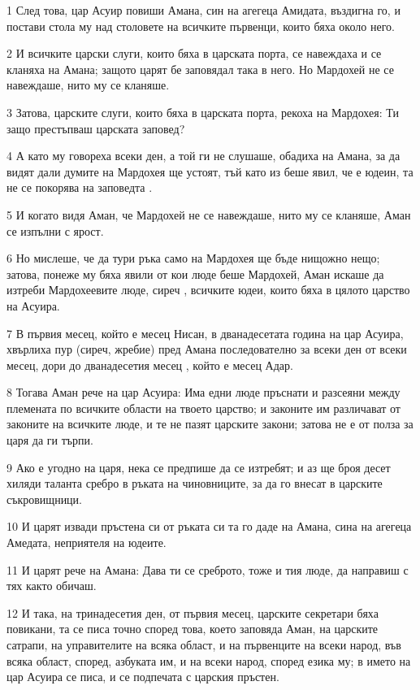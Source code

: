 \par 1 След това, цар Асуир повиши Амана, син на агегеца Амидата, въздигна го, и постави стола му над столовете на всичките първенци, които бяха около него.
\par 2 И всичките царски слуги, които бяха в царската порта, се навеждаха и се кланяха на Амана; защото царят бе заповядал така в него. Но Мардохей не се навеждаше, нито му се кланяше.
\par 3 Затова, царските слуги, които бяха в царската порта, рекоха на Мардохея: Ти защо престъпваш царската заповед?
\par 4 А като му говореха всеки ден, а той ги не слушаше, обадиха на Амана, за да видят дали думите на Мардохея ще устоят, тъй като из беше явил, че е юдеин, та не се покорява на заповедта .
\par 5 И когато видя Аман, че Мардохей не се навеждаше, нито му се кланяше, Аман се изпълни с ярост.
\par 6 Но мислеше, че да тури ръка само на Мардохея ще бъде нищожно нещо; затова, понеже му бяха явили от кои люде беше Мардохей, Аман искаше да изтреби Мардохеевите люде, сиреч , всичките юдеи, които бяха в цялото царство на Асуира.
\par 7 В първия месец, който е месец Нисан, в дванадесетата година на цар Асуира, хвърлиха пур (сиреч, жребие) пред Амана последователно за всеки ден от всеки месец, дори до дванадесетия месец , който е месец Адар.
\par 8 Тогава Аман рече на цар Асуира: Има едни люде пръснати и разсеяни между племената по всичките области на твоето царство; и законите им различават от законите на всичките люде, и те не пазят царските закони; затова не е от полза за царя да ги търпи.
\par 9 Ако е угодно на царя, нека се предпише да се изтребят; и аз ще броя десет хиляди таланта сребро в ръката на чиновниците, за да го внесат в царските съкровищници.
\par 10 И царят извади пръстена си от ръката си та го даде на Амана, сина на агегеца Амедата, неприятеля на юдеите.
\par 11 И царят рече на Амана: Дава ти се среброто, тоже и тия люде, да направиш с тях както обичаш.
\par 12 И така, на тринадесетия ден, от първия месец, царските секретари бяха повикани, та се писа точно според това, което заповяда Аман, на царските сатрапи, на управителите на всяка област, и на първенците на всеки народ, във всяка област, според, азбуката им, и на всеки народ, според езика му; в името на цар Асуира се писа, и се подпечата с царския пръстен.
